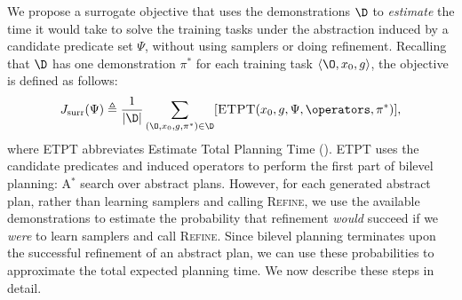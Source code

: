 We propose a surrogate objective that uses the demonstrations $\D$ to \emph{estimate} the time it would take to solve the training tasks under the abstraction induced by a candidate predicate set $\Psi$, without using samplers or doing refinement.
Recalling that $\D$ has one demonstration $\pi^*$ for each training task $\langle \O, x_0, g \rangle$, the objective is defined as follows:
$$J_{\text{surr}}(\Psi) \triangleq \frac{1}{|\D|} \sum_{(\O, x_0, g, \pi^*) \in \D}[\textsc{ETPT}(x_0, g, \Psi, \operators, \pi^*)],$$
where \textsc{ETPT} abbreviates Estimate Total Planning Time ().
\textsc{ETPT} uses the candidate predicates and induced operators to perform the first part of bilevel planning: A$^*$ search over abstract plans.
However, for each generated abstract plan, rather than learning samplers and calling \textsc{Refine}, we use the available demonstrations to estimate the probability that refinement \emph{would} succeed if we \emph{were} to learn samplers and call \textsc{Refine}.
Since bilevel planning terminates upon the successful refinement of an abstract plan, we can use these probabilities to approximate the total expected planning time.
We now describe these steps in detail.

